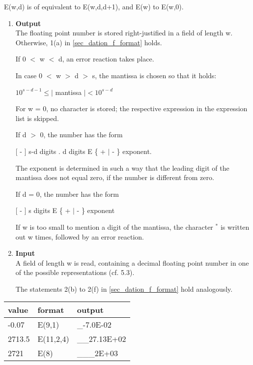 E(w,d) is of equivalent to E(w,d,d+1), and E(w) to E(w,0).

\begin{removed}
\begin{enumerate}
\item {\bf Output}\\
The floating point number is stored right-justified in a field of length
w. Otherwise, 1(a) in \ref{sec_dation_f_format} holds.

If 0 $<$ w $<$ d, an error reaction takes place.

In case 0 $<$ w $>$ d $>$ s, the mantissa is chosen so that it holds:

\hspace*{1cm}$10^{s-d-1} \leq \mid$ mantissa $\mid < 10^{s-d}$

For w = 0, no character is stored; the respective expression in the
expression list is skipped.

If d $>$ 0, the number has the form

\hspace*{1cm}[ - ] s-d digits . d digits E \{ + $\mid$ - \} exponent.

The exponent is determined in such a way that the leading digit of the
mantissa does not equal zero, if the number is different from zero.

If d = 0, the number has the form

\hspace*{1cm}[ - ] s digits E \{ + $\mid$ - \} exponent

If w is too small to mention a digit of the mantissa, the character $^*$
is written out w times, followed by an error reaction.
\item {\bf Input}\\
A field of length w is read, containing a decimal floating point number
in one of the possible representations (cf. 5.3).

The statements 2(b) to 2(f) in \ref{sec_dation_f_format} hold analogously.
\end{enumerate}

\begin{tabular}{lll}
value  & format    & output \\ \hline
-0.07  & E(9,1)    & \_-7.0E-02 \\
2713.5 & E(11,2,4) & \_\_27.13E+02 \\
2721   & E(8)      & \_\_\_2E+03
\end{tabular}
\end{removed}

